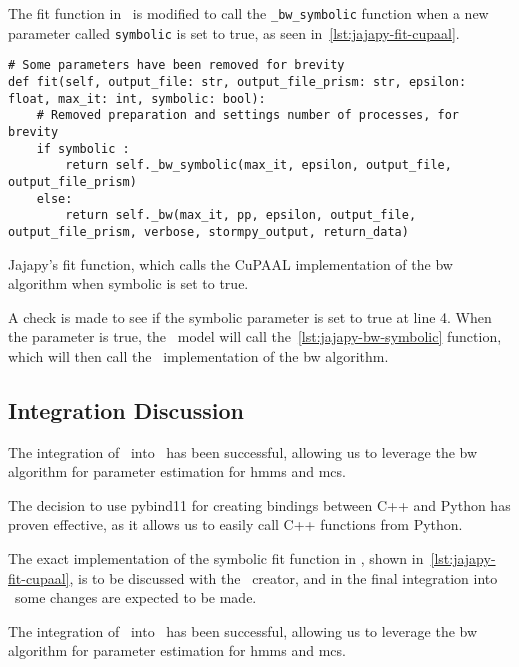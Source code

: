 The fit function in \Jajapy\ is modified to call the \texttt{\_bw\_symbolic} function when a new parameter called \texttt{symbolic} is set to true, as seen in~\autoref{lst:jajapy-fit-cupaal}.


\begin{listing}
    \begin{verbatim}
# Some parameters have been removed for brevity
def fit(self, output_file: str, output_file_prism: str, epsilon: float, max_it: int, symbolic: bool):
    # Removed preparation and settings number of processes, for brevity
    if symbolic :
        return self._bw_symbolic(max_it, epsilon, output_file, output_file_prism)
    else:
        return self._bw(max_it, pp, epsilon, output_file, output_file_prism, verbose, stormpy_output, return_data)
      \end{verbatim}
    \caption{Jajapy's fit function, which calls the CuPAAL implementation of the \gls{bw} algorithm when symbolic is set to true.}
    \label{lst:jajapy-fit-cupaal}
\end{listing}

A check is made to see if the symbolic parameter is set to true at line 4. When the parameter is true, the \Jajapy\ model will call the~\autoref{lst:jajapy-bw-symbolic} function, which will then call the \Cupaal\ implementation of the \gls{bw} algorithm.

\subsection{Integration Discussion}\label{subsec:integration-discussion}
The integration of \Cupaal\ into \Jajapy\ has been successful, allowing us to leverage the \gls{bw} algorithm for parameter estimation for \glspl{hmm} and \glspl{mc}.

The decision to use pybind11 for creating bindings between C++ and Python has proven effective, as it allows us to easily call C++ functions from Python.

The exact implementation of the symbolic fit function in \Jajapy, shown in~\autoref{lst:jajapy-fit-cupaal}, is to be discussed with the \Jajapy\ creator, and in the final integration into \Jajapy\ some changes are expected to be made.

The integration of \Cupaal\ into \Jajapy\ has been successful, allowing us to leverage the \gls{bw} algorithm for parameter estimation for \glspl{hmm} and \glspl{mc}.
